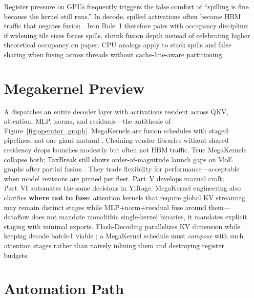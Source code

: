 Register pressure on GPUs frequently triggers the false comfort of ``spilling is fine because the kernel still runs.''
In decode, spilled activations often become HBM traffic that negates fusion \citep{nvidia2022hopper,memoryfloor2026}.
Iron Rule~1 therefore pairs with occupancy discipline: if widening tile sizes forces spills, shrink fusion depth instead of celebrating higher theoretical occupancy on paper.
CPU analogs apply to stack spills and false sharing when fusing across threads without cache-line-aware partitioning.

\section{Megakernel Preview}
\label{sec:megakernel_preview}

A  dispatches an entire decoder layer with activations resident across QKV, attention, MLP, norms, and residuals---the antithesis of Figure~\ref{fig:operator_graph}.
MegaKernels are fusion schedules with staged pipelines, not one giant matmul \citep{dao2022flashattention,taxbreak2026}.
Chaining vendor libraries without shared residency drops launches modestly but often not HBM traffic.
True MegaKernels collapse both; TaxBreak still shows order-of-magnitude launch gaps on MoE graphs after partial fusion \citep{taxbreak2026}.
They trade flexibility for performance---acceptable when model revisions are pinned per fleet.
Part~V develops manual craft; Part~VI automates the same decisions in YiRage.
MegaKernel engineering also clarifies \textbf{where not to fuse}: attention kernels that require global KV streaming may remain distinct stages while MLP+norm+residual fuse around them---dataflow does not mandate monolithic single-kernel binaries, it mandates explicit staging with minimal exports.
Flash-Decoding parallelizes KV dimension while keeping decode batch-1 viable \citep{dao2023flashdecoding}; a MegaKernel schedule must \emph{compose} with such attention stages rather than naively inlining them and destroying register budgets.

\section{Automation Path}
\label{sec:automation_path}

